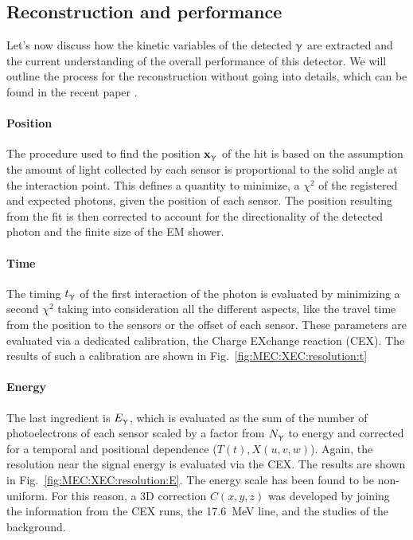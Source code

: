 \begin{refsection}
    \subsection{Reconstruction and performance}
        Let's now discuss how the kinetic variables of the detected $\upgamma$ are extracted and the current understanding of the overall performance of this detector. 
        We will outline the process for the reconstruction without going into details, which can be found in the recent paper \cite{MEG_II:detector}.
        
        \paragraph{Position} The procedure used to find the position $\textbf{x}_\upgamma$ of the hit is based on the assumption the amount of light collected by each sensor is proportional to the solid angle at the interaction point.
        This defines a quantity to minimize, a $\chi^2$ of the registered and expected photons, given the position of each sensor.   
        The position resulting from the fit is then corrected to account for the directionality of the detected photon and the finite size of the EM shower.

        \paragraph{Time} The timing $t_\upgamma$ of the first interaction of the photon is evaluated by minimizing a second $\chi^2$ taking into consideration all the different aspects, like the travel time from the position to the sensors or the offset of each sensor.
        These parameters are evaluated via a dedicated calibration, the Charge EXchange reaction (CEX).
        The results of such a calibration are shown in Fig.~\ref{fig:MEC:XEC:resolution:t}

        \paragraph{Energy} The last ingredient is $E_\upgamma$, which is evaluated as the sum of the number of photoelectrons of each sensor scaled by a factor from $N_\upgamma$ to energy and corrected for a temporal and positional dependence ($T(t), X(u,v,w)$).
        Again, the resolution near the signal energy is evaluated via the CEX. The results are shown in Fig.~\ref{fig:MEC:XEC:resolution:E}.
        The energy scale has been found to be non-uniform. 
        For this reason, a 3D correction $C(x,y,z)$ was developed by joining the information from the CEX runs, the  \SI{17.6}{MeV} line, and the studies of the background.


\end{refsection}
